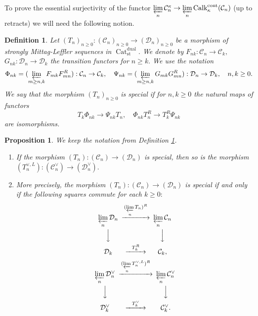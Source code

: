 \documentclass[11pt,leqno]{amsart}
\newtheorem{defi}[theo]{Definition}
\newtheorem{prop}[theo]{Proposition}
\numberwithin{equation}{section}
\newcommand{\prolim}[1][]{\mathop{\varprojlim}\limits_{#1}}
\newcommand{\Cat}{\operatorname{Cat}}
\newcommand{\cont}{\operatorname{cont}}
\newcommand{\st}{\operatorname{st}}
\newcommand{\dual}{\operatorname{dual}}
\newcommand{\cD}{{\mathcal D}}
\newcommand{\cC}{{\mathcal C}}
\newcommand{\Calk}{\operatorname{Calk}}
\begin{document}
To prove the essential surjectivity of the functor $\prolim[n]\cC_n^{\kappa}\to\prolim[n]\Calk_{\kappa}^{\cont}(\cC_n)$ (up to retracts) we will need the following notion.

\begin{defi}\label{def:special_map_of_ML} Let $(T_n)_{n\geq 0}:(\cC_n)_{n\geq 0}\to(\cD_n)_{n\geq 0}$ be a morphism of strongly Mittag-Leffler sequences in $\Cat_{\st}^{\dual}.$ We denote by $F_{nk}:\cC_n\to\cC_k,$ $G_{nk}:\cD_n\to\cD_k$ the transition functors for $n\geq k.$ We use the notation \begin{equation*}
\Phi_{nk}=(\prolim[m\geq n,k]F_{mk}F_{mn}^R):\cC_n\to\cC_k,\quad \Psi_{nk}=(\prolim[m\geq n,k]G_{mk}G_{mn}^R):\cD_n\to\cD_k,\quad n,k\geq 0.	
\end{equation*} We say that the morphism $(T_n)_{n\geq 0}$ is special if for $n,k\geq 0$ the natural maps of functors
\begin{equation*}
T_k\Phi_{nk}\to\Psi_{nk}T_n,\quad \Phi_{nk}T_n^R\to T_k^R\Psi_{nk}	
\end{equation*}
are isomorphisms.\end{defi}

\begin{prop}\label{prop:basic_descr_of_special_maps} We keep the notation from Definition \ref{def:special_map_of_ML}.
\begin{enumerate}[label=(\roman*),ref=(\roman*)]
\item If the morphism $(T_n):(\cC_n)\to (\cD_n)$ is special, then so is the morphism $(T_n^{\vee,L}):(\cC_n^{\vee})\to (\cD_n^{\vee}).$ \label{speciality_is_self_dual}

\item More precisely, the morphism $(T_n):(\cC_n)\to (\cD_n)$ is special if and only if the following squares commute for each $k\geq 0:$
\begin{equation}
\label{eq:right_adj_naive1}
\begin{CD}
\prolim[n]\cD_n @>{(\prolim[n]T_n)^R}>> \prolim[n]\cC_n\\
@VVV @VVV\\
\cD_k @>{T_k^R}>> \cC_k,
\end{CD}
\end{equation}
\begin{equation}
	\label{eq:right_adj_naive2}
	\begin{CD}
		\prolim[n]\cD_n^{\vee} @>{(\prolim[n]T_n^{\vee,L})^R}>> \prolim[n]\cC_n^{\vee}\\
		@VVV @VVV\\
		\cD_k^{\vee} @>{T_k^{\vee}}>> \cC_k^{\vee}.
	\end{CD}
\end{equation}
\label{right_adjoints_termwise}
\end{enumerate}
\end{prop}
\end{document}
